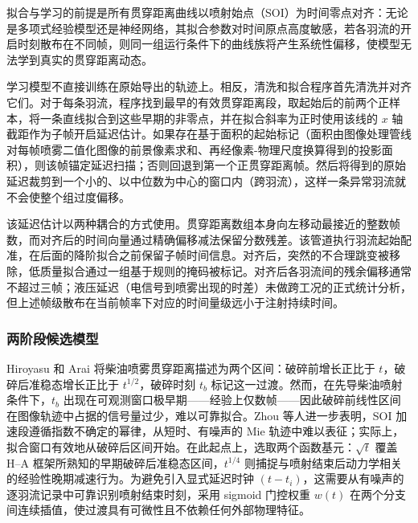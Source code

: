 拟合与学习的前提是所有贯穿距离曲线以喷射始点（SOI）为时间零点对齐：无论是多项式经验模型还是神经网络，其拟合参数对时间原点高度敏感，若各羽流的开启时刻散布在不同帧，则同一组运行条件下的曲线族将产生系统性偏移，使模型无法学到真实的贯穿距离动态。

学习模型不直接训练在原始导出的轨迹上。相反，清洗和拟合程序首先清洗并对齐它们。对于每条羽流，程序找到最早的有效贯穿距离段，取起始后的前两个正样本，将一条直线拟合到这些早期的非零点，并在拟合斜率为正时使用该线的 \(x\) 轴截距作为子帧开启延迟估计。如果存在基于面积的起始标记（面积由图像处理管线对每帧喷雾二值化图像的前景像素求和、再经像素-物理尺度换算得到的投影面积），则该帧锚定延迟扫描；否则回退到第一个正贯穿距离帧。然后将得到的原始延迟裁剪到一个小的、以中位数为中心的窗口内（跨羽流），这样一条异常羽流就不会使整个组过度偏移。

该延迟估计以两种耦合的方式使用。贯穿距离数组本身向左移动最接近的整数帧数，而对齐后的时间向量通过精确偏移减法保留分数残差。该管道执行羽流起始配准，在后面的降阶拟合之前保留子帧时间信息。对齐后，突然的不合理跳变被移除，低质量拟合通过一组基于规则的掩码被标记。对齐后各羽流间的残余偏移通常不超过三帧；液压延迟（电信号到喷雾出现的时差）未做跨工况的正式统计分析，但上述帧级散布在当前帧率下对应的时间量级远小于注射持续时间。

\subsubsection{两阶段候选模型}

Hiroyasu 和 Arai 将柴油喷雾贯穿距离描述为两个区间：破碎前增长正比于 \(t\)，破碎后准稳态增长正比于 \(t^{1/2}\)，破碎时刻 \(t_b\) 标记这一过渡\cite{HiroyasuArai1990}。然而，在先导柴油喷射条件下，\(t_b\) 出现在可观测窗口极早期——经验上仅数帧——因此破碎前线性区间在图像轨迹中占据的信号量过少，难以可靠拟合。Zhou 等人进一步表明，SOI 加速段遵循指数不确定的幂律，从短时、有噪声的 Mie 轨迹中难以表征\cite{ZhouLiYi2021}；实际上，拟合窗口有效地从破碎后区间开始。在此起点上，选取两个函数基元：\(\sqrt{t}\) 覆盖 H--A 框架所熟知的早期破碎后准稳态区间，\(t^{1/4}\) 则捕捉与喷射结束后动力学相关的经验性晚期减速行为\cite{ZhouLiLaiWei2019}。为避免引入显式延迟时钟 \((t-t_i)\)，这需要从有噪声的逐羽流记录中可靠识别喷射结束时刻，采用 sigmoid 门控权重 \(w(t)\) 在两个分支间连续插值，使过渡具有可微性且不依赖任何外部物理特征。

